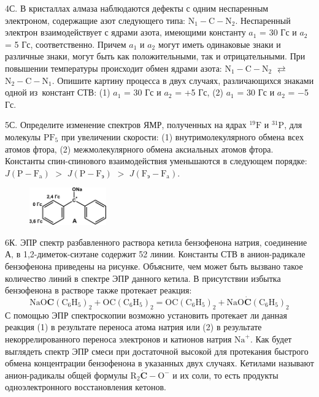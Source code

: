 4С. В кристаллах алмаза наблюдаются дефекты с одним неспаренным электроном, содержащие азот следующего типа: $\text{N}_1-\text{C}-\text{N}_2$. Неспаренный электрон взаимодействует с ядрами азота, имеющими константу $a_1$ = 30 Гс и $a_2$ = 5 Гс, соответственно. Причем $a_1$ и $a_2$ могут иметь одинаковые знаки и различные знаки, могут быть как положительными, так и отрицательными. При повышении температуры происходит обмен ядрами азота: $\text{N}_1-\text{C}-\text{N}_2$ $\rightleftarrows$ $\text{N}_2-\text{C}-\text{N}_1$. Опишите картину процесса в двух случаях, различающихся знаками одной из~констант СТВ: (1) $a_1$ = 30 Гс и $a_2$ = +5 Гс, (2) $a_1$ = 30 Гс и $a_2$ = $-$5 Гс.
\par
5С. Определите изменение спектров ЯМР, полученных на ядрах $^{19}\text{F}$ и $^{31}\text{P}$, для молекулы $\text{PF}_5$ при увеличении скорости: (1) внутримолекулярного обмена всех атомов фтора, (2) межмолекулярного обмена аксиальных атомов фтора. Константы спин-спинового взаимодействия уменьшаются в следующем порядке: $J(\text{P}-\text{F}_\text{a})$ $>$ $J(\text{P}-\text{F}_\text{э})$ $>$ $J(\text{F}_\text{э}-\text{F}_\text{a})$.
\par
\begin{figure} %
    \centering
    \vspace{0.7mm}
    \includegraphics[width=33mm]{images/Fig_2_8_8.png}
    \vspace{0mm}
\end{figure}
6К. ЭПР спектр разбавленного раствора кетила бензофенона натрия, соединение А, в 1,2-диметок-сиэтане содержит 52 линии. Константы СТВ в анион-радикале бензофенона приведены на рисунке. Объясните, чем может быть вызвано такое количество линий в спектре ЭПР данного кетила. В присутствии избытка бензофенона в растворе также протекает реакция:
\[\text{NaO}\boldsymbol{\dot{\text{C}}}(\text{C}_6\text{H}_5)_2 + \text{O}\text{C}(\text{C}_6\text{H}_5)_2 = \text{O}\text{C}(\text{C}_6\text{H}_5)_2 + \text{NaO}\boldsymbol{\dot{\text{C}}}(\text{C}_6\text{H}_5)_2\]
С помощью ЭПР спектроскопии возможно установить протекает ли данная реакция (1) в результате переноса атома натрия или (2) в результате некоррелированного переноса электронов и катионов натрия $\text{Na}^+$. Как будет выглядеть спектр ЭПР смеси при достаточной высокой для протекания быстрого обмена концентрации бензофенона в указанных двух случаях. Кетилами называют анион-радикалы общей формулы $\text{R}_2 \boldsymbol{\dot{\text{C}}}-\text{O}^-$ и их соли, то есть продукты одноэлектронного восстановления кетонов.
\par